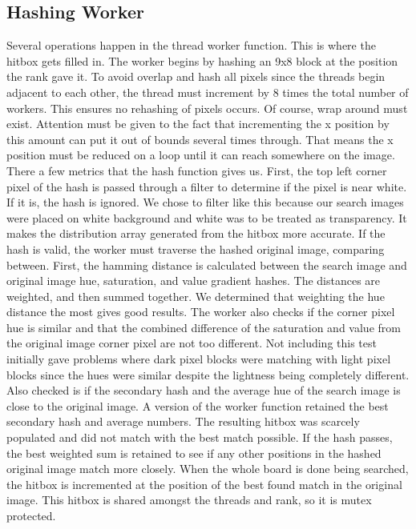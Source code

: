\documentclass[10pt, journal]{vgtc}                %
\begin{document}
\subsection{Hashing Worker}
Several operations happen in the thread worker function. This is where the hitbox gets filled in. The worker begins by hashing an 9x8 block at the position the rank gave it. To avoid overlap and hash all pixels since the threads begin adjacent to each other, the thread must increment by 8 times the total number of workers. This ensures no rehashing of pixels occurs. Of course, wrap around must exist. Attention must be given to the fact that incrementing the x position by this amount can put it out of bounds several times through. That means the x position must be reduced on a loop until it can reach somewhere on the image.\\
There a few metrics that the hash function gives us. First, the top left corner pixel of the hash is passed through a filter to determine if the pixel is near white. If it is, the hash is ignored. We chose to filter like this because our search images were placed on white background and white was to be treated as transparency. It makes the distribution array generated from the hitbox more accurate. If the hash is valid, the worker must traverse the hashed original image, comparing between. 
First, the hamming distance is calculated between the search image and original image hue, saturation, and value gradient hashes. The distances are weighted, and then summed together. We determined that weighting the hue distance the most gives good results. The worker also checks if the corner pixel hue is similar and that the combined difference of the saturation and value from the original image corner pixel are not too different. Not including this test initially gave problems where dark pixel blocks were matching with light pixel blocks since the hues were similar despite the lightness being completely different.\\
Also checked is if the secondary hash and the average hue of the search image is close to the original image. A version of the worker function retained the best secondary hash and average numbers. The resulting hitbox was scarcely populated and did not match with the best match possible.
If the hash passes, the best weighted sum is retained to see if any other positions in the hashed original image match more closely. When the whole board is done being searched, the hitbox is incremented at the position of the best found match in the original image. This hitbox is shared amongst the threads and rank, so it is mutex protected. 
\end{document}
